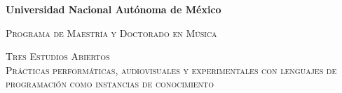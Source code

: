 \documentclass[12pt]{article}
\author{Emilio Ocelotl Reyes}
\begin{document}
\begin{titlepage}                                                                                                                                                             
  \begin{center}                                                                                                                                                              
    \centering                                                                                                                                                                
\vspace{1cm}                                                                                                                                                                  
{\bfseries\LARGE Universidad Nacional Autónoma de México \par}                                                                                                                
\vspace{1cm}                                                                                                                                                                  
{\scshape\Large Programa de Maestría y Doctorado en Música \par}                                                                                                              
\vspace{3cm}                                                                                                                                                                  
       {\scshape\Huge   Tres Estudios Abiertos \\                                                                                                                             
         \large Prácticas performáticas, audiovisuales y experimentales con lenguajes de programación como instancias de conocimiento\par}                                                                                  
\vspace{3cm}                                                                                                                                                                  
\vfill                                                                                                                                                                        

\end{center}
\end{titlepage}
\end{document}
